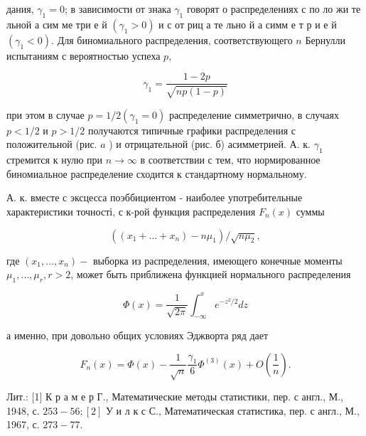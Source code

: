\documentclass[10pt]{article}
\begin{document}
дания, $\gamma_{1}=0$; в зависимости от знака $\gamma_{1}$ говорят о распределениях с по ло жи те льной а сим ме три е й $\left(\gamma_{1}>0\right)$ и с от риц а те льно й а симм е т р и е й $\left(\gamma_{1}<0\right)$. Для биномиального распределения, соответствующего $n$ Бернулли испытаниям с вероятностью успеха $p$,



\[

\gamma_{1}=\frac{1-2 p}{\sqrt{n p(1-p)}}

\]



при этом в случае $p=1 / 2\left(\gamma_{1}=0\right)$ распределение симметрично, в случаях $p<1 / 2$ и $p>1 / 2$ получаются типичные графики распределения с положительной (рис. $a$ ) и отрицательной (рис. б) асимметрией. А. к. $\gamma_{1}$ стремится к нулю при $n \rightarrow \infty$ в соответствии с тем, что нормированное биномиальное распределение сходится к стандартному нормальному.



А. к. вместе с эксцесса поэббициентом - наиболее употребительные характеристики точності, с к-рой функция распределения $F_{n}(x)$ суммы



\[

\left(\left(x_{1}+\ldots+x_{n}\right)-n \mu_{1}\right) / \sqrt{n \mu_{2}},

\]



где $\left(x_{1}, \ldots, x_{n}\right)-$ выборка из распределения, имеющего конечные моменты $\mu_{1}, \ldots, \mu_{r}, r>2$, может быть приближена функцией нормального распределения



\[

\Phi(x)=\frac{1}{\sqrt{2 \pi}} \int_{-\infty}^{x} e^{-z^{2} / 2} d z

\]



а именно, при довольно общих условиях Эджворта ряд дает



\[

F_{n}(x)=\Phi(x)-\frac{1}{\sqrt{n}} \frac{\gamma_{1}}{6} \Phi^{(3)}(x)+O\left(\frac{1}{n}\right) .

\]



Лит.: [1] К р а м е р Г., Математические методы статистики, пер. с англ., М., 1948, с. $253-56 ;[2]$ У и л к с С., Математическая статистика, пер. с англ., М., 1967, с. $273-77$.
\end{document}
